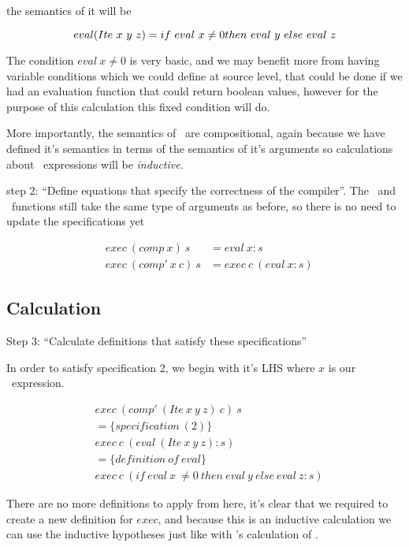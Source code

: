 \documentclass {article}
\begin{document}
the semantics of it will be

	\[eval(Ite\ x\ y\ z) \\
		= if\ eval\ x \not= 0 then\ eval\ y\ else\ eval\ z \]

The condition $eval \ x  \not= 0$ is very basic,
and we may benefit more from having variable conditions
which we could define at source level,
that could be done if we had an evaluation function 
that could return boolean values, 
however for the purpose of this calculation
this fixed condition will do.

More importantly, the semantics of \ite\
are compositional, 
again because we have defined it's
semantics in terms of the semantics of 
it's arguments so
calculations about \ite\ expressions
will be \emph{inductive}.

step 2: ``Define equations that specify the correctness of the compiler''.
The \exec\ and \comp\ functions still take the same
type of arguments as before,
so there is no need to update the specifications yet

\begin{eqnarray*}
	 &exec \  (comp \  x) \  s &= eval \  x:s \\
	 &exec \  (comp' \  x \  c) \ s &= exec \  c \  (eval \ x:s) 
\end{eqnarray*}

\subsection{Calculation}

Step 3: ``Calculate definitions that 
		satisfy these specifications''

In order to satisfy specification 2,
we begin with it's LHS where $x$ is our
\ite\ expression.

\begin{align*}
	&exec \ (comp' \ (Ite \ x \ y \ z) \ c) \ s \\
	&= \{specification \ (2) \} \\
	&exec \ c \ (eval \ (Ite \ x \ y \ z) : s) \\
	&= \{definition \ of \ eval\} \\
	&exec \ c \ (if \ eval \ x \ \not= 0 \ then \ eval \ y \ else \ eval \ z :s)
\end{align*}

There are no more definitions to apply from here,
it's clear that we required to
create a new definition for $exec$,
and because this is an inductive calculation
we can use the inductive hypotheses
just like with \BH's calculation of \add.
\end{document}
